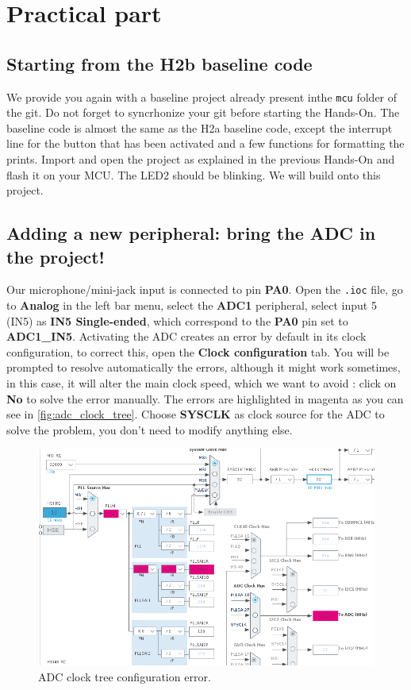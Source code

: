 \clearpage
\section{Practical part}


\subsection{Starting from the H2b baseline code}
We provide you again with a baseline project already present inthe \texttt{mcu} folder of the git. Do not forget to syncrhonize your git before starting the Hands-On. The baseline code is almost the same as the H2a baseline code, except the interrupt line for the button that has been activated and a few functions for formatting the prints. Import and open the project as explained in the previous Hands-On and flash it on your MCU. The LED2 should be blinking. We will build onto this project.


\subsection{Adding a new peripheral: bring the ADC in the project!}
Our microphone/mini-jack input is connected to pin \textbf{PA0}. Open the \texttt{.ioc} file, go to \textbf{Analog} in the left bar menu, select the \textbf{ADC1} peripheral, select input 5 (IN5) as \textbf{IN5 Single-ended}, which correspond to the \textbf{PA0} pin set to \textbf{ADC1\_IN5}. Activating the ADC creates an error by default in its clock configuration, to correct this, open the \textbf{Clock configuration} tab. You will be prompted to resolve automatically the errors, although it might work sometimes, in this case, it will alter the main clock speed, which we want to avoid : click on \textbf{No} to solve the error manually. The errors are highlighted in magenta as you can see in \autoref{fig:adc_clock_tree}. Choose \textbf{SYSCLK} as clock source for the ADC to solve the problem, you don't need to modify anything else.

\begin{figure}[h]
    \centering
    \includegraphics[scale=0.4]{figures/adc_clock_tree.png}
    \caption{ADC clock tree configuration error. }
    \label{fig:adc_clock_tree}
\end{figure}

